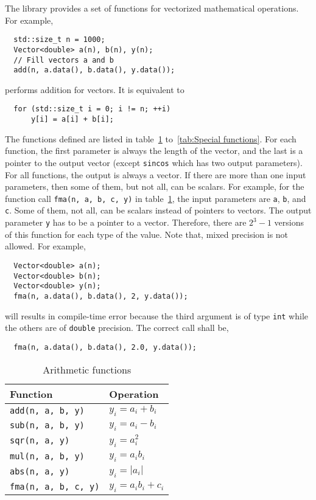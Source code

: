 The library provides a set of functions for vectorized mathematical operations.
For example,
\begin{Verbatim}
  std::size_t n = 1000;
  Vector<double> a(n), b(n), y(n);
  // Fill vectors a and b
  add(n, a.data(), b.data(), y.data());
\end{Verbatim}
performs addition for vectors. It is equivalent to
\begin{Verbatim}
  for (std::size_t i = 0; i != n; ++i)
      y[i] = a[i] + b[i];
\end{Verbatim}
The functions defined are listed in table~\ref{tab:Arithmetic functions}
to~\ref{tab:Special functions}. For each function, the first parameter is
always the length of the vector, and the last is a pointer to the output vector
(except \verb|sincos| which has two output parameters). For all functions, the
output is always a vector. If there are more than one input parameters, then
some of them, but not all, can be scalars. For example, for the function call
\verb|fma(n, a, b, c, y)| in table~\ref{tab:Arithmetic functions}, the input
parameters are \verb|a|, \verb|b|, and \verb|c|. Some of them, not all, can be
scalars instead of pointers to vectors. The output parameter \verb|y| has to be
a pointer to a vector. Therefore, there are $2^3 - 1$ versions of this function
for each type of the value. Note that, mixed precision is not allowed. For
example,
\begin{Verbatim}
  Vector<double> a(n);
  Vector<double> b(n);
  Vector<double> y(n);
  fma(n, a.data(), b.data(), 2, y.data());
\end{Verbatim}
will results in compile-time error because the third argument is of type
\verb|int| while the others are of \verb|double| precision. The correct call
shall be,
\begin{Verbatim}
  fma(n, a.data(), b.data(), 2.0, y.data());
\end{Verbatim}

\begin{table}
  \begin{tabularx}{\textwidth}{XX}
    \toprule
    Function & Operation \\
    \midrule
    \verb|add(n, a, b, y)|    & $y_i = a_i + b_i$     \\
    \verb|sub(n, a, b, y)|    & $y_i = a_i - b_i$     \\
    \verb|sqr(n, a, y)|       & $y_i = a_i^2$         \\
    \verb|mul(n, a, b, y)|    & $y_i = a_i b_i$       \\
    \verb|abs(n, a, y)|       & $y_i = |a_i|$         \\
    \verb|fma(n, a, b, c, y)| & $y_i = a_i b_i + c_i$ \\
    \bottomrule
  \end{tabularx}
  \caption{Arithmetic functions}
  \label{tab:Arithmetic functions}
\end{table}

